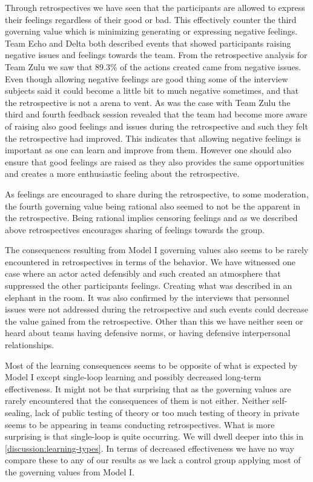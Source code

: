 Through retrospectives we have seen that the participants are allowed to express their feelings regardless of their good or bad. This effectively counter the third governing value which is minimizing generating or expressing negative feelings. Team Echo and Delta both described events that showed participants raising negative issues and feelings towards the team. From the retrospective analysis for Team Zulu we saw that 89.3\% of the actions created came from negative issues. Even though allowing negative feelings are good thing some of the interview subjects said it could become a little bit to much negative sometimes, and that the retrospective is not a arena to vent. As was the case with Team Zulu the third and fourth feedback session revealed that the team had become more aware of raising also good feelings and issues during the retrospective and such they felt the retrospective had improved. This indicates that allowing negative feelings is important as one can learn and improve from them. However one should also ensure that good feelings are raised as they also provides the same opportunities and creates a more enthusiastic feeling about the retrospective.

As feelings are encouraged to share during the retrospective, to some moderation, the fourth governing value being rational also seemed to not be the apparent in the retrospective. Being rational implies censoring feelings and as we described above retrospectives encourages sharing of feelings towards the group. 

The consequences resulting from Model I governing values also seems to be rarely encountered in retrospectives in terms of the behavior. We have witnessed one case where an actor acted defensibly and such created an atmosphere that suppressed the other participants feelings. Creating what was described in an elephant in the room. It was also confirmed by the interviews that personnel issues were not addressed during the retrospective and such events could decrease the value gained from the retrospective. Other than this we have neither seen or heard about teams having defensive norms, or having defensive interpersonal relationships. 

Most of the learning consequences seems to be opposite of what is expected by Model I except single-loop learning and possibly decreased long-term effectiveness. It might not be that surprising that as the governing values are rarely encountered that the consequences of them is not either. Neither self-sealing, lack of public testing of theory or too much testing of theory in private seems to be appearing in teams conducting retrospectives. What is more surprising is that single-loop is quite occurring. We will dwell deeper into this in \autoref{discussion:learning-types}. In terms of decreased effectiveness we have no way compare these to any of our results as we lack a control group applying most of the governing values from Model I. 

